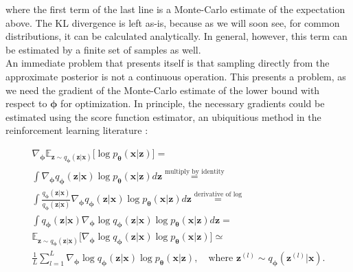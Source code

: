 \documentclass{report}
\begin{document}
\noindent where the first term of the last line is a Monte-Carlo estimate of the expectation above. The KL divergence is left as-is, because as we will soon see, for common distributions, it can be calculated analytically. In general, however, this term can be estimated by a finite set of samples as well. \\

\noindent An immediate problem that presents itself is that sampling directly from the approximate posterior is not a continuous operation. This presents a problem, as we need the gradient of the Monte-Carlo estimate of the lower bound with respect to $\boldsymbol{\phi}$ for optimization. In principle, the necessary gradients could be estimated using the score function estimator, an ubiquitious method in the reinforcement learning literature \cite{Williams1992}:

\begin{equation}
\begin{gathered}
\nabla_{\boldsymbol{\phi}} \mathbb{E}_{\boldsymbol{z} \sim q_{\boldsymbol{\phi}}(\boldsymbol{z}|\boldsymbol{x})} \big[ \log p_{\boldsymbol{\theta}} (\boldsymbol{x} | \boldsymbol{z}) \big] = \\
\int \nabla_{\boldsymbol{\phi}} q_{\boldsymbol{\phi}}(\boldsymbol{z}|\boldsymbol{x}) \log p_{\boldsymbol{\theta}}(\boldsymbol{x} | \boldsymbol{z}) d \boldsymbol{z} \stackrel{\text{multiply by identity}}{=} \\
\int \frac{q_{\boldsymbol{\phi}}(\boldsymbol{z}|\boldsymbol{x})}{q_{\boldsymbol{\phi}}(\boldsymbol{z}|\boldsymbol{x})} \nabla_{\boldsymbol{\phi}} q_{\boldsymbol{\phi}}(\boldsymbol{z}|\boldsymbol{x}) \log p_{\boldsymbol{\theta}}(\boldsymbol{x} | \boldsymbol{z}) d \boldsymbol{z} \stackrel{\text{derivative of log}}{=} \\
\int q_{\boldsymbol{\phi}}(\boldsymbol{z}|\boldsymbol{x}) \nabla_{\boldsymbol{\phi}} \log q_{\boldsymbol{\phi}}(\boldsymbol{z}|\boldsymbol{x}) \log p_{\boldsymbol{\theta}}(\boldsymbol{x} | \boldsymbol{z}) d \boldsymbol{z} = \\
\mathbb{E}_{\boldsymbol{z} \sim q_{\boldsymbol{\phi}}(\boldsymbol{z}|\boldsymbol{x})} \big[ \nabla_{\boldsymbol{\phi}} \log q_{\boldsymbol{\phi}}(\boldsymbol{z}|\boldsymbol{x}) \log p_{\boldsymbol{\theta}}(\boldsymbol{x} | \boldsymbol{z}) \big] \simeq \\
\frac{1}{L} \sum_{l=1}^L \nabla_{\boldsymbol{\phi}} \log q_{\boldsymbol{\phi}}(\boldsymbol{z}|\boldsymbol{x}) \log p_{\boldsymbol{\theta}}(\boldsymbol{x} | \boldsymbol{z}), \quad \text{where } \boldsymbol{z}^{(l)} \sim q_{\boldsymbol{\phi}}(\boldsymbol{z}^{(l)} | \boldsymbol{x}).
\end{gathered}
\end{equation} \\
\end{document}
